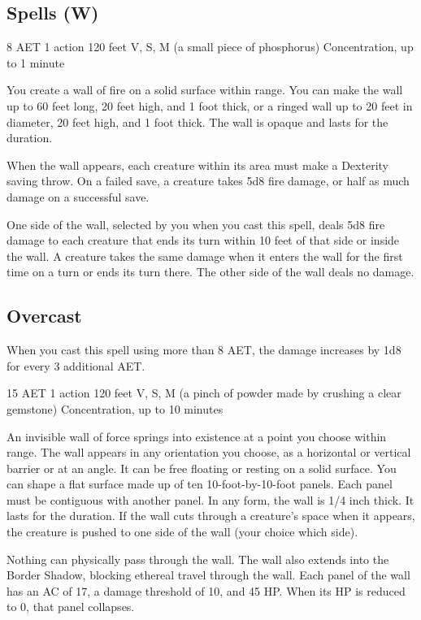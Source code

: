 \subsection{Spells (W)}
\label{spell:wall-of-fire}
{8 AET}
{1 action}
{120 feet}
{V, S, M (a small piece of phosphorus)}
{Concentration, up to 1 minute}

You create a wall of fire on a solid surface within range. You can make the wall up to 60 feet long, 20 feet high, and 1 foot thick, or a ringed wall up to 20 feet in diameter, 20 feet high, and 1 foot thick. The wall is opaque and lasts for the duration.

When the wall appears, each creature within its area must make a Dexterity saving throw. On a failed save, a creature takes 5d8 fire damage, or half as much damage on a successful save.

One side of the wall, selected by you when you cast this spell, deals 5d8 fire damage to each creature that ends its turn within 10 feet of that side or inside the wall. A creature takes the same damage when it enters the wall for the first time on a turn or ends its turn there. The other side of the wall deals no damage.

\subsection*{Overcast} When you cast this spell using more than 8 AET, the damage increases by 1d8 for every 3 additional AET.

\label{spell:wall-of-force}
{15 AET}
{1 action}
{120 feet}
{V, S, M (a pinch of powder made by crushing a clear gemstone)}
{Concentration, up to 10 minutes}

An invisible wall of force springs into existence at a point you choose within range. The wall appears in any orientation you choose, as a horizontal or vertical barrier or at an angle. It can be free floating or resting on a solid surface. You can shape a flat surface made up of ten 10-foot-by-10-foot panels. Each panel must be contiguous with another panel. In any form, the wall is 1/4 inch thick. It lasts for the duration. If the wall cuts through a creature's space when it appears, the creature is pushed to one side of the wall (your choice which side).

Nothing can physically pass through the wall. The wall also extends into the Border Shadow, blocking ethereal travel through the wall. Each panel of the wall has an AC of 17, a damage threshold of 10, and 45 HP. When its HP is reduced to 0, that panel collapses.

